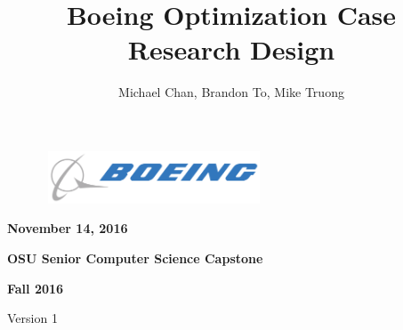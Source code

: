 \documentclass[a4,draftclsnofoot,onecolumn,margin=0.75,10pt]{IEEEtran}
\author{Michael Chan, Brandon To, Mike Truong}
\begin{document}


\title{Boeing Optimization Case Research Design{}}
\maketitle{}


{\centering{}\bfseries\color{black}
\includegraphics[width=3.4362in,height=0.6134in]{Boeing-Logo.png} %
\par}


\begin{figure}
\centering
\end{figure}



{\centering{}\bfseries\color{black}
November 14, 2016
\par}

{\centering{}\bfseries\color{black}
OSU Senior Computer Science Capstone
\par}

{\centering{}\bfseries\color{black}
Fall 2016

Version 1
\par}

\bigskip
\end{document}
